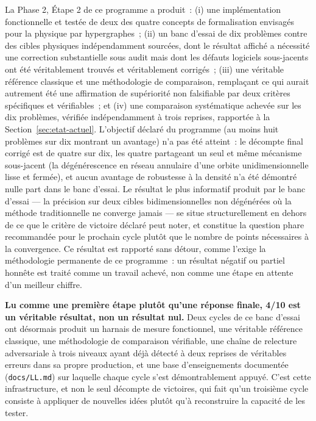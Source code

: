 \documentclass[11pt,a4paper]{article}
\begin{document}
La Phase 2, Étape 2 de ce programme a produit~: (i) une implémentation
fonctionnelle et testée de deux des quatre concepts de formalisation
envisagés pour la physique par hypergraphes~; (ii) un banc d'essai de dix
problèmes contre des cibles physiques indépendamment sourcées, dont le
résultat affiché a nécessité une correction substantielle sous audit mais
dont les défauts logiciels sous-jacents ont été véritablement trouvés et
véritablement corrigés~; (iii) une véritable référence classique et une
méthodologie de comparaison, remplaçant ce qui aurait autrement été une
affirmation de supériorité non falsifiable par deux critères spécifiques
et vérifiables~; et (iv) une comparaison systématique achevée sur les dix
problèmes, vérifiée indépendamment à trois reprises, rapportée à la
Section~\ref{sec:etat-actuel}. L'objectif déclaré du programme (au moins
huit problèmes sur dix montrant un avantage) n'a pas été atteint~: le
décompte final corrigé est de quatre sur dix, les quatre partageant un
seul et même mécanisme sous-jacent (la dégénérescence en réseau annulaire
d'une orbite unidimensionnelle lisse et fermée), et aucun avantage de
robustesse à la densité n'a été démontré nulle part dans le banc d'essai.
Le résultat le plus informatif produit par le banc d'essai --- la
précision sur deux cibles bidimensionnelles non dégénérées où la méthode
traditionnelle ne converge jamais --- se situe structurellement en dehors
de ce que le critère de victoire déclaré peut noter, et constitue la
question phare recommandée pour le prochain cycle plutôt que le nombre de
points nécessaires à la convergence. Ce résultat est rapporté sans
détour, comme l'exige la méthodologie permanente de ce programme~: un
résultat négatif ou partiel honnête est traité comme un travail achevé,
non comme une étape en attente d'un meilleur chiffre.

\textbf{Lu comme une première étape plutôt qu'une réponse finale, 4/10 est
un véritable résultat, non un résultat nul.} Deux cycles de ce banc
d'essai ont désormais produit un harnais de mesure fonctionnel, une
véritable référence classique, une méthodologie de comparaison vérifiable,
une chaîne de relecture adversariale à trois niveaux ayant déjà détecté à
deux reprises de véritables erreurs dans sa propre production, et une base
d'enseignements documentée (\texttt{docs/LL.md}) sur laquelle chaque cycle
s'est démontrablement appuyé. C'est cette infrastructure, et non le seul
décompte de victoires, qui fait qu'un troisième cycle consiste à appliquer
de nouvelles idées plutôt qu'à reconstruire la capacité de les tester.
\end{document}
